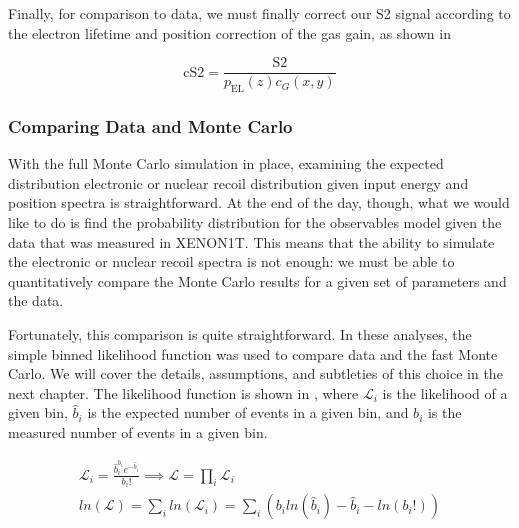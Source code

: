 Finally, for comparison to data, we must finally correct our S2 signal according to the electron lifetime and position correction of the gas gain, as shown in 


\begin{equation}
        \label{eqn:s2_correction}
        \textrm{cS2} = \frac{\textrm{S2}}{p_{\textrm{EL}}(z) c_G(x, y)} 
\end{equation}


\subsubsection{Comparing Data and Monte Carlo}
\label{sec:xe1t_mc_electrons}

With the full Monte Carlo simulation in place, examining the expected distribution electronic or nuclear recoil distribution given input energy and position spectra is straightforward.  At the end of the day, though, what we would like to do is find the probability distribution for the observables model given the data that was measured in XENON1T.  This means that the ability to simulate the electronic or nuclear recoil spectra is not enough: we must be able to quantitatively compare the Monte Carlo results for a given set of parameters and the data.

Fortunately, this comparison is quite straightforward.  In these analyses, the simple binned likelihood function was used to compare data and the fast Monte Carlo.  We will cover the details, assumptions, and subtleties of this choice in the next chapter.  The likelihood function is shown in , where $\mathcal{L}_i$ is the likelihood of a given bin, $\hat{b}_i$ is the expected number of events in a given bin, and $b_i$ is the measured number of events in a given bin.

\begin{equation}
        \label{eqn:xe1t_binned_likelihood}
        \begin{gathered}
                \mathcal{L}_i = \frac{\hat{b}_i^{b_i} e^{-\hat{b}_i}}{b_i!} \implies \mathcal{L} = \prod_i \mathcal{L}_i \\ 
                ln(\mathcal{L}) = \sum_i ln(\mathcal{L}_i) = \sum_i ( b_i ln(\hat{b}_i) - \hat{b}_i - ln(b_i!) )
        \end{gathered}
\end{equation}


